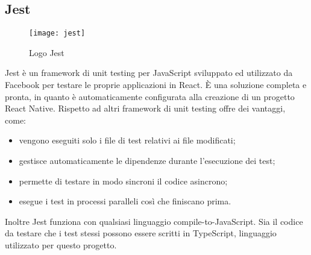 \subsection{Jest}
\begin{figure}[H] 
	\centering
	\texttt{[image: jest]}
	\caption{Logo Jest}
\end{figure}
Jest è un framework di unit testing per JavaScript sviluppato ed utilizzato da
Facebook per testare le proprie applicazioni in React. È una soluzione completa
e pronta, in quanto è automaticamente configurata alla creazione di un progetto
React Native.
Rispetto ad altri framework di unit testing offre dei vantaggi, come: 
\begin{itemize}
	\item vengono eseguiti solo i file di test relativi ai file modificati;
	\item gestisce automaticamente le dipendenze durante l'esecuzione dei test;
	\item permette di testare in modo sincroni il codice asincrono;
	\item esegue i test in processi paralleli così che finiscano prima.
\end{itemize}
Inoltre Jest funziona con qualsiasi linguaggio compile-to-JavaScript. Sia il codice da testare che i test stessi possono essere scritti in TypeScript, linguaggio utilizzato per questo progetto. 
